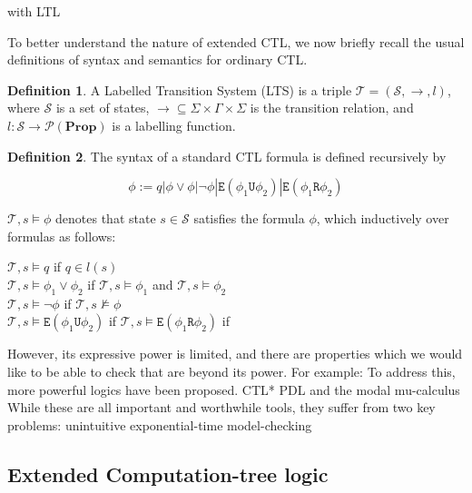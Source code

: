 \documentclass[11pt]{article}
\theoremstyle{definition}
\newtheorem{mydef}{Definition}
\begin{document}
with LTL

To better understand the nature of extended CTL, we now briefly recall the
usual definitions of syntax and semantics for ordinary CTL.

\begin{mydef}
A Labelled Transition System (LTS) is a triple $\mathcal{T} = (\mathcal{S}, \rightarrow, l)$,
where $\mathcal{S}$ is a set of states, $\rightarrow \subseteq \Sigma \times
\Gamma \times \Sigma$ is the transition relation, and $l:\mathcal{S}
\rightarrow \mathcal{P}(\textbf{Prop})$ is a labelling function.
\end{mydef}

\begin{mydef}
The syntax of a standard CTL formula is defined recursively by

\[ \phi := q | \phi \vee \phi | \neg \phi | \texttt{E}(\phi_1 \texttt{U} \phi_2) | \texttt{E}(\phi_1 \texttt{R} \phi_2) \]

$\mathcal{T}, s \models \phi$ denotes that state $s \in \mathcal{S}$ satisfies
the formula $\phi$, which 
inductively over formulas as follows:

$\mathcal{T}, s \models q$ if $q \in l(s)$ \\
$\mathcal{T}, s \models \phi_1 \vee \phi_2$ if $\mathcal{T}, s \models \phi_1$
and $\mathcal{T}, s \models \phi_2$ \\
$\mathcal{T}, s \models \neg \phi $ if $\mathcal{T}, s \not\models \phi$ \\
$\mathcal{T}, s \models \texttt{E}(\phi_1 \texttt{U} \phi_2) $ if %
$\mathcal{T}, s \models \texttt{E}(\phi_1 \texttt{R} \phi_2) $ if %

\end{mydef}
However, its expressive power is limited, and there are properties which we
would like to be able to check that are beyond its power.
For example: 
To address this, more powerful logics have been proposed. CTL* %
 PDL %
and the modal mu-calculus
While these are all important and worthwhile tools, they suffer from two key problems: 
unintuitive
exponential-time model-checking


\subsection{Extended Computation-tree logic}
\end{document}
